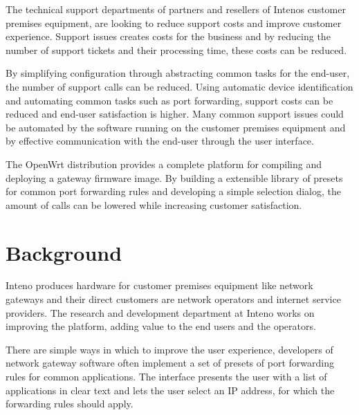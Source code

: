 \documentclass[a4paper,11pt]{kth-bcs}
\begin{document}
The technical support departments of partners and resellers of Intenos
customer premises equipment, are looking to reduce support costs and improve customer experience. 
Support issues creates costs for the business and by reducing the number of support tickets and their processing time, these costs can be reduced.

By simplifying configuration through abstracting common tasks for the end-user, the number of support calls can be reduced.
Using automatic device identification and automating common tasks such as port forwarding, support costs can be reduced and end-user satisfaction is higher.
Many common support issues could be automated by the software running on the customer premises equipment and by effective communication with the end-user through the user interface.

The OpenWrt distribution provides a complete platform for compiling and
deploying a gateway firmware image.
By building a extensible library of presets for common port forwarding rules and developing a simple selection dialog, the amount of calls can be lowered while increasing customer satisfaction.




\chapter{Background}

Inteno produces hardware for customer premises equipment like network gateways and their direct customers are network operators and internet service providers.
The research and development department at Inteno works on improving the platform, adding value to the end users and the operators.

There are simple ways in which to improve the user experience, developers of network gateway software often implement a set of presets of port forwarding rules for common applications.
The interface presents the user with a list of applications in clear text and lets the user select an IP address, for which the forwarding rules should apply.
\end{document}
